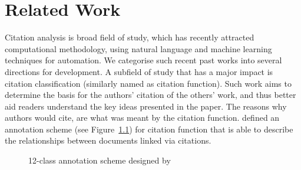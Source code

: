 \chapter{Related Work}
\label{Related Works}

Citation analysis is broad field of study, which has recently attracted computational methodology, using natural language and machine learning techniques for automation.  We categorise such recent past works into several directions for development.  A subfield of study that has a major impact is citation classification (similarly named as citation function). Such work aims to determine the basis for the authors' citation of the others' work, and thus better aid readers understand the key ideas presented in the paper. The reasons why authors would cite, are what was meant by the citation function.  defined an annotation scheme (see Figure~\ref{fig:teufelannotationscheme}) for citation function that is able to describe the relationships between documents linked via citations.

\begin{figure}[h]
\caption{12-class annotation scheme designed by \protect{}}
\label{fig:teufelannotationscheme}
\end{figure}

